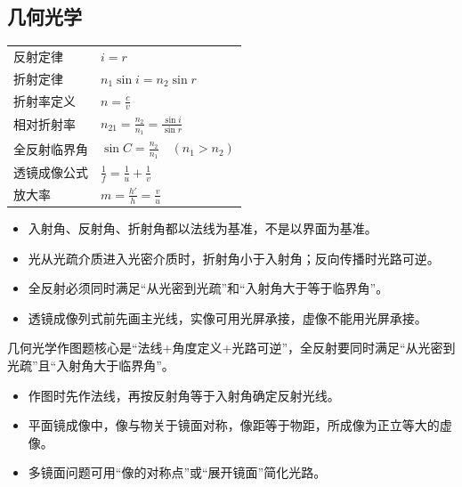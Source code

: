 
\subsection{几何光学}
\begin{tabularx}{\columnwidth}{XX}
  反射定律 & $i=r$ \\
  折射定律 & $n_1\sin i=n_2\sin r$ \\
  折射率定义 & $n=\frac{c}{v}$ \\
  相对折射率 & $n_{21}=\frac{n_2}{n_1}=\frac{\sin i}{\sin r}$ \\
  全反射临界角 & $\sin C=\frac{n_2}{n_1}\quad(n_1>n_2)$ \\
  透镜成像公式 & $\frac{1}{f}=\frac{1}{u}+\frac{1}{v}$ \\
  放大率 & $m=\frac{h'}{h}=\frac{v}{u}$ \\
\end{tabularx}

\begin{formulanotebox}
\begin{itemize}[leftmargin=1.5em]
  \item 入射角、反射角、折射角都以法线为基准，不是以界面为基准。
  \item 光从光疏介质进入光密介质时，折射角小于入射角；反向传播时光路可逆。
  \item 全反射必须同时满足“从光密到光疏”和“入射角大于等于临界角”。
  \item 透镜成像列式前先画主光线，实像可用光屏承接，虚像不能用光屏承接。
\end{itemize}
\end{formulanotebox}

\begin{keypointbox}
几何光学作图题核心是“法线+角度定义+光路可逆”，全反射要同时满足“从光密到光疏”且“入射角大于临界角”。
\end{keypointbox}

\begin{casetypebox}[title={\strut\textcolor{white}{\bfseries 常见题型：反射定律}}]
\begin{itemize}[leftmargin=1.5em]
  \item 作图时先作法线，再按反射角等于入射角确定反射光线。
  \item 平面镜成像中，像与物关于镜面对称，像距等于物距，所成像为正立等大的虚像。
  \item 多镜面问题可用“像的对称点”或“展开镜面”简化光路。
\end{itemize}
\end{casetypebox}

